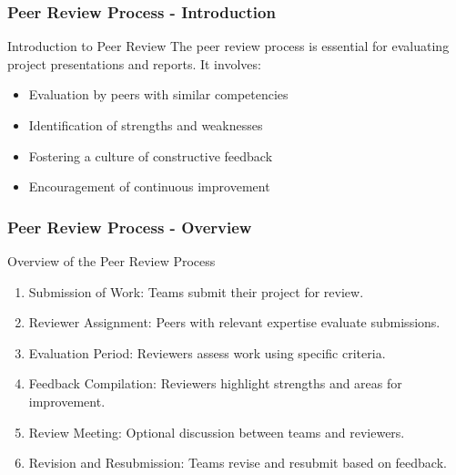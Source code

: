 \documentclass[aspectratio=169]{beamer}
\begin{document}
\begin{frame}[fragile]
  \frametitle{Peer Review Process - Introduction}
  \begin{block}{Introduction to Peer Review}
    The peer review process is essential for evaluating project presentations and reports. It involves:
    \begin{itemize}
      \item Evaluation by peers with similar competencies
      \item Identification of strengths and weaknesses
      \item Fostering a culture of constructive feedback
      \item Encouragement of continuous improvement
    \end{itemize}
  \end{block}
\end{frame}

\begin{frame}[fragile]
  \frametitle{Peer Review Process - Overview}
  \begin{block}{Overview of the Peer Review Process}
    \begin{enumerate}
      \item Submission of Work: Teams submit their project for review.
      \item Reviewer Assignment: Peers with relevant expertise evaluate submissions.
      \item Evaluation Period: Reviewers assess work using specific criteria.
      \item Feedback Compilation: Reviewers highlight strengths and areas for improvement.
      \item Review Meeting: Optional discussion between teams and reviewers.
      \item Revision and Resubmission: Teams revise and resubmit based on feedback.
    \end{enumerate}
  \end{block}
\end{frame}
\end{document}
